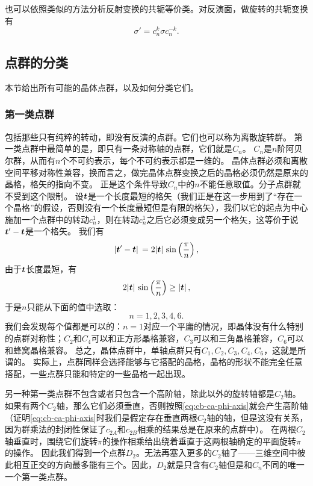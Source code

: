 也可以依照类似的方法分析反射变换的共轭等价类。对反演面，做旋转的共轭变换有
\begin{equation}
    \sigma' = c_n^k \sigma c_n^{-k}.
\end{equation}

\subsection{点群的分类}

本节给出所有可能的晶体点群，以及如何分类它们。

\subsubsection{第一类点群} 

包括那些只有纯粹的转动，即没有反演的点群。它们也可以称为离散旋转群。
第一类点群中最简单的是，即只有一条对称轴的点群，它们就是$C_n$。
$C_n$是$n$阶阿贝尔群，从而有$n$个不可约表示，每个不可约表示都是一维的。
晶体点群必须和离散空间平移对称性兼容，换而言之，做完晶体点群变换之后的晶格必须仍然是原来的晶格，格矢的指向不变。
正是这个条件导致$C_n$中的$n$不能任意取值。分子点群就不受到这个限制。
设$\vb*{t}$是一个长度最短的格矢（我们正是在这一步用到了“存在一个晶格”的假设，否则没有一个长度最短但是有限的格矢），我们以它的起点为中心施加一个点群中的转动$c_n^1$，则在转动$c_n^1$之后它必须变成另一个格矢，这等价于说$\vb*{t}' - \vb*{t}$是一个格矢。
我们有
\[
    \abs*{\vb*{t}' - \vb*{t}} = 2 \abs*{\vb*{t}} \sin\left(\frac{\pi}{n}\right),
\]
由于$\vb*{t}$长度最短，有
\[
    2 \abs*{\vb*{t}} \sin\left(\frac{\pi}{n}\right) \geq \abs*{\vb*{t}},
\]
于是$n$只能从下面的值中选取：
\[
    n = 1, 2, 3, 4, 6.
\]
我们会发现每个值都是可以的：$n=1$对应一个平庸的情况，即晶体没有什么特别的点群对称性；$C_2$和$C_4$可以和正方形晶格兼容，$C_3$可以和三角晶格兼容，$C_6$可以和蜂窝晶格兼容。
总之，晶体点群中，单轴点群只有$C_1, C_2, C_3, C_4, C_6$，这就是所谓的。
实际上，点群同样会选择能够与它搭配的晶格，晶格的形状不能完全任意搭配，一些点群只能和特定的一些晶格一起出现。

另一种第一类点群不包含或者只包含一个高阶轴，除此以外的旋转轴都是$C_2$轴。
如果有两个$C_2$轴，那么它们必须垂直，否则按照\eqref{eq:cb-ca-phi-axis}就会产生高阶轴（证明\eqref{eq:cb-ca-phi-axis}时我们是假定存在垂直两根$C_2$轴的轴，但是这没有关系，因为群乘法的封闭性保证了$c_{2A}$和$c_{2B}$相乘的结果总是在原来的点群中）。
在两根$C_2$轴垂直时，围绕它们旋转$\pi$的操作相乘给出绕着垂直于这两根轴确定的平面旋转$\pi$的操作。
因此我们得到一个点群$D_2$。无法再塞入更多的$C_2$轴了——三维空间中彼此相互正交的方向最多能有三个。因此，$D_2$就是只含有$C_2$轴但是和$C_n$不同的唯一一个第一类点群。

